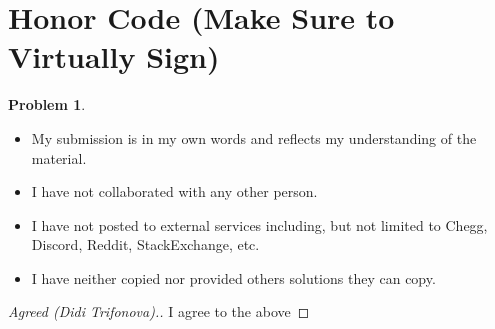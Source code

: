 \documentclass[11pt]{article}
\theoremstyle{definition}
\theoremstyle{definition}
\newtheorem{required}{Problem}
\theoremstyle{definition}
\begin{document}
\section{Honor Code (Make Sure to Virtually Sign)} \label{HonorCode}

\begin{required}
\noindent 
\begin{itemize}
\item My submission is in my own words and reflects my understanding of the material.
\item I have not collaborated with any other person.
\item I have not posted to external services including, but not limited to Chegg, Discord, Reddit, StackExchange, etc.
\item I have neither copied nor provided others solutions they can copy.
\end{itemize}

\end{required}

\begin{proof}[Agreed (Didi Trifonova).]
I agree to the above
\end{proof}


\newpage
\end{document}
